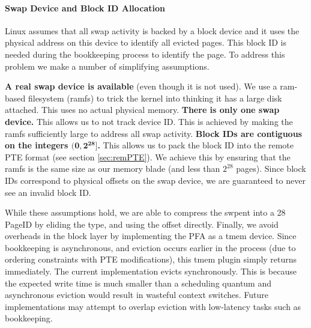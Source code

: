 \paragraph{Swap Device and Block ID Allocation}
Linux assumes that all swap activity is backed by a block device and it uses
the physical address on this device to identify all evicted pages. This block
ID is needed during the bookkeeping process to identify the page. To address
this problem we make a number of simplifying assumptions.

\begin{outline}[enumerate]
	\1 \textbf{A real swap device is available} (even though it is not used). We
		use a ram-based filesystem (ramfs) to trick the kernel into thinking it has
		a large disk attached. This uses no actual physical memory.
	\1 \textbf{There is only one swap device.} This allows us to not track device
		ID. This is achieved by making the ramfs sufficiently large to address all
		swap activity.
	\1 \textbf{Block IDs are contiguous on the integers $\mathbf{(0, 2^{28}]}$.}
		This allows us to pack the block ID into the remote PTE format (see section
		\ref{sec:remPTE}). We achieve this by ensuring that the ramfs is the same
		size as our memory blade (and less than $2^{28}$ pages). Since block IDs
		correspond to physical offsets on the swap device, we are guaranteed to
		never see an invalid block ID.
\end{outline}

While these assumptions hold, we are able to compress the \gls{swpent} into a
\SI{28}{\bit} PageID by eliding the type, and using the offset directly.
Finally, we avoid overheads in the block layer by implementing the PFA as a
\gls{tmem} device. Since bookkeeping is asynchronous, and eviction occurs
earlier in the process (due to ordering constraints with PTE modifications),
this \gls{tmem} plugin simply returns immediately. The current implementation
evicts synchronously. This is because the expected write time is much smaller
than a scheduling quantum and asynchronous eviction would result in wasteful
context switches. Future implementations may attempt to overlap eviction with
low-latency tasks such as bookkeeping.

